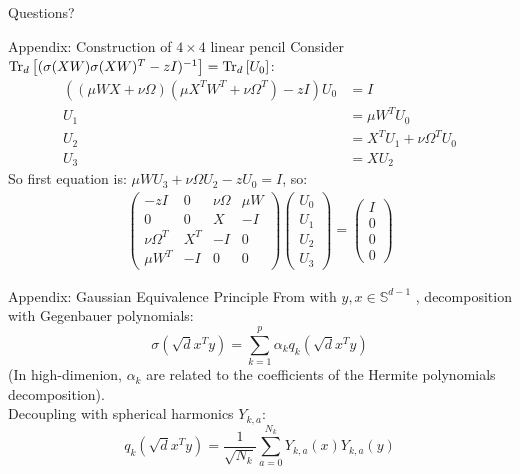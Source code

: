 \documentclass[10pt]{beamer}
\begin{document}
\begin{frame}[standout]
  Questions?
\end{frame}

\begin{frame}{Appendix: Construction of $4\times 4$ linear pencil}
  Consider $\traceLim[d]{(\sigma(XW) \sigma(XW)^{T} - zI)^{-1}} = \traceLim[d]{U_0}$:
  \begin{align*}
    ((\mu W X + \nu \Omega) (\mu X^T W^T + \nu \Omega^T) - z I) U_0 & = I\\
    U_1 & = \mu W^T U_0 \\
    U_2 & = X^T U_1 + \nu \Omega^T U_0\\
    U_3 & = X U_2
  \end{align*}
  So first equation is: $ \mu W U_3 + \nu \Omega U_2 - z U_0 = I$, so:
  \begin{align*}
    \begin{pmatrix}
      -z I & 0 & \nu \Omega & \mu W\\
      0 & 0 & X & -I\\
      \nu \Omega^T & X^T & -I & 0\\
      \mu W^T & -I & 0 & 0
    \end{pmatrix}
    \begin{pmatrix}
      U_0\\
      U_1\\
      U_2\\
      U_3
    \end{pmatrix}
    = 
    \begin{pmatrix}
      I\\
      0\\
      0\\
      0
    \end{pmatrix}
  \end{align*}

\end{frame}


\begin{frame}{Appendix: Gaussian Equivalence Principle}
  From \cite{lu2022equivalence,mei2020generalization} with $y,x \in \mathbb S^{d-1}$ , decomposition with Gegenbauer polynomials:
  \begin{equation*}
    \sigma(\sqrt{d} x^T y) = \sum_{k=1}^{p} \alpha_k q_k(\sqrt{d} x^T y)
  \end{equation*}
  (In high-dimenion, $\alpha_k$ are related to the coefficients of the Hermite polynomials decomposition).\\
  Decoupling with spherical harmonics $Y_{k,a}$:
  \begin{equation*}
    q_k(\sqrt{d} x^T y) = \frac{1}{\sqrt{N_k}} \sum_{a=0}^{N_k} Y_{k,a}(x) Y_{k,a}(y)
  \end{equation*}
\end{frame}
  
\end{document}
